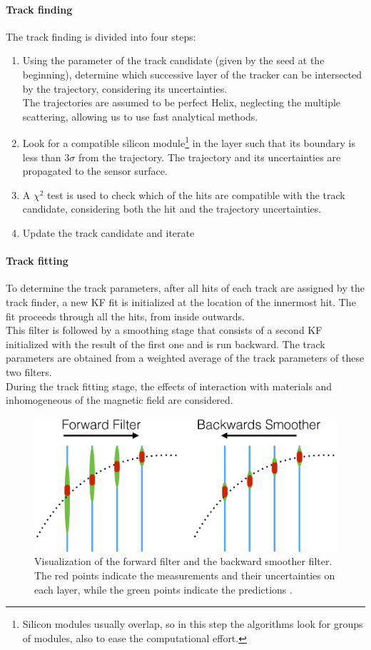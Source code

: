 \paragraph*{Track finding}
The track finding is divided into four steps:
\begin{enumerate}
    \item Using the parameter of the track candidate (given by the seed at the beginning), determine which successive layer of the tracker can be intersected by the trajectory, considering its uncertainties.\\ The trajectories are assumed to be perfect Helix, neglecting the multiple scattering, allowing us to use fast analytical methods.
    \item Look for a compatible silicon module\footnote{Silicon modules usually overlap, so in this step the algorithms look for groups of modules, also to ease the computational effort.} in the layer such that its boundary is less than $3 \sigma$ from the trajectory. The trajectory and its uncertainties are propagated to the sensor surface.
    \item A $\chi^2$ test is used to check which of the hits are compatible with the track candidate, considering both the hit and the trajectory uncertainties.
    \item Update the track candidate and iterate
\end{enumerate}
\paragraph*{Track fitting}
To determine the track parameters, after all hits of each track are assigned by the track finder, a new KF fit is initialized at the location of the innermost hit. The fit proceeds through all the hits, from inside outwards.\\
This filter is followed by a smoothing stage that consists of a second KF initialized with the result of the first one and is run backward. The track parameters are obtained from a weighted average of the track parameters of these two filters.\\
During the track fitting stage, the effects of interaction with materials and  inhomogeneous of the magnetic field are considered.

\begin{figure}[H]
    \centering
    \includegraphics[width=0.75\linewidth]{fig//chap04-reco/KF.png}
    \caption{Visualization of the forward filter and the backward smoother filter. The red points indicate the measurements and their uncertainties on each layer, while the green points indicate the predictions \cite{Ai2021AFitting}.}
    \label{fig:KF}
\end{figure}

